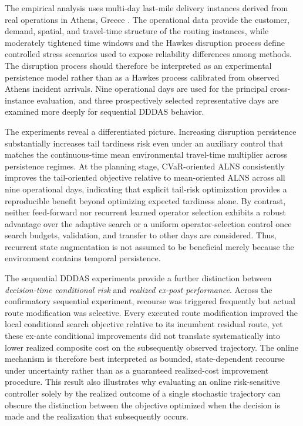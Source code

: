 \documentclass[preprint,12pt]{elsarticle}
\newcommand{\1}{\mathbf{1}}
\begin{document}
The empirical analysis uses multi-day last-mile delivery instances derived from real
operations in Athens, Greece \citep{Vrani2025DataInBrief}.
The operational data provide the customer, demand, spatial, and travel-time structure of
the routing instances, while moderately tightened time windows and the Hawkes disruption
process define controlled stress scenarios used to expose reliability differences among
methods.
The disruption process should therefore be interpreted as an experimental persistence
model rather than as a Hawkes process calibrated from observed Athens incident arrivals.
Nine operational days are used for the principal cross-instance evaluation, and three
prospectively selected representative days are examined more deeply for sequential
DDDAS behavior.

The experiments reveal a differentiated picture.
Increasing disruption persistence substantially increases tail tardiness risk even under
an auxiliary control that matches the continuous-time mean environmental travel-time
multiplier across persistence regimes.
At the planning stage, CVaR-oriented ALNS consistently improves the tail-oriented
objective relative to mean-oriented ALNS across all nine operational days, indicating
that explicit tail-risk optimization provides a reproducible benefit beyond optimizing
expected tardiness alone.
By contrast, neither feed-forward nor recurrent learned operator selection exhibits a
robust advantage over the adaptive search or a uniform operator-selection control once
search budgets, validation, and transfer to other days are considered.
Thus, recurrent state augmentation is not assumed to be beneficial merely because the
environment contains temporal persistence.

The sequential DDDAS experiments provide a further distinction between
\emph{decision-time conditional risk} and \emph{realized ex-post performance}.
Across the confirmatory sequential experiment, recourse was triggered frequently but
actual route modification was selective.
Every executed route modification improved the local conditional search objective relative
to its incumbent residual route, yet these ex-ante conditional improvements did not
translate systematically into lower realized composite cost on the subsequently observed
trajectory.
The online mechanism is therefore best interpreted as bounded, state-dependent recourse
under uncertainty rather than as a guaranteed realized-cost improvement procedure.
This result also illustrates why evaluating an online risk-sensitive controller solely by
the realized outcome of a single stochastic trajectory can obscure the distinction between
the objective optimized when the decision is made and the realization that subsequently
occurs.
\end{document}
